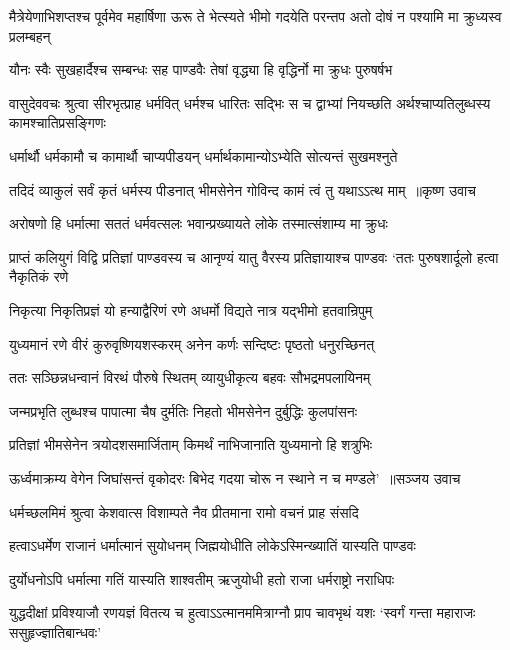 \threelineshloka
{मैत्रेयेणाभिशप्तश्च पूर्वमेव महार्षिणा}
{ऊरू ते भेत्स्यते भीमो गदयेति परन्तप}
{अतो दोषं न पश्यामि मा क्रुध्यस्व प्रलम्बहन्}


\twolineshloka
{यौनः स्वैः सुखहार्दैश्च सम्बन्धः सह पाण्डवैः}
{तेषां वृद्ध्या हि वृद्धिर्नो मा क्रुधः पुरुषर्षभ}


वासुदेववचः श्रुत्वा सीरभृत्प्राह धर्मवित्
\twolineshloka
{धर्मश्च धारितः सद्भिः स च द्वाभ्यां नियच्छति}
{अर्थश्चाप्यतिलुब्धस्य कामश्चातिप्रसङ्गिणः}


\twolineshloka
{धर्मार्थौ धर्मकामौ च कामार्थौ चाप्यपीडयन्}
{धर्मार्थकामान्योऽभ्येति सोत्यन्तं सुखमश्नुते}


\threelineshloka
{तदिदं व्याकुलं सर्वं कृतं धर्मस्य पीडनात्}
{भीमसेनेन गोविन्द कामं त्वं तु यथाऽऽत्थ माम् ॥कृष्ण उवाच}
{}


\twolineshloka
{अरोषणो हि धर्मात्मा सततं धर्मवत्सलः}
{भवान्प्रख्यायते लोके तस्मात्संशाम्य मा क्रुधः}


\threelineshloka
{प्राप्तं कलियुगं विद्वि प्रतिज्ञां पाण्डवस्य च}
{आनृण्यं यातु वैरस्य प्रतिज्ञायाश्च पाण्डवः}
{`ततः पुरुषशार्दूलो हत्वा नैकृतिकं रणे}


\twolineshloka
{निकृत्या निकृतिप्रज्ञं यो हन्याद्वैरिणं रणे}
{अधर्मो विद्यते नात्र यद्भीमो हतवान्रिपुम्}


\twolineshloka
{युध्यमानं रणे वीरं कुरुवृष्णियशस्करम्}
{अनेन कर्णः सन्दिष्टः पृष्ठतो धनुरच्छिनत्}


\twolineshloka
{ततः सञ्छिन्नधन्वानं विरथं पौरुषे स्थितम्}
{व्यायुधीकृत्य बहवः सौभद्रमपलायिनम्}


\twolineshloka
{जन्मप्रभृति लुब्धश्च पापात्मा चैष दुर्मतिः}
{निहतो भीमसेनेन दुर्बुद्धिः कुलपांसनः}


\twolineshloka
{प्रतिज्ञां भीमसेनेन त्रयोदशसमार्जिताम्}
{किमर्थं नाभिजानाति युध्यमानो हि शत्रुभिः}


\threelineshloka
{ऊर्ध्वमाक्रम्य वेगेन जिघांसन्तं वृकोदरः}
{बिभेद गदया चोरू न स्थाने न च मण्डले' ॥सञ्जय उवाच}
{}


\twolineshloka
{धर्मच्छलमिमं श्रुत्वा केशवात्स विशाम्पते}
{नैव प्रीतमाना रामो वचनं प्राह संसदि}


\twolineshloka
{हत्वाऽधर्मेण राजानं धर्मात्मानं सुयोधनम्}
{जिह्मयोधीति लोकेऽस्मिन्ख्यातिं यास्यति पाण्डवः}


\twolineshloka
{दुर्योधनोऽपि धर्मात्मा गतिं यास्यति शाश्वतीम्}
{ऋजुयोधी हतो राजा धर्मराष्ट्रो नराधिपः}


\threelineshloka
{युद्धदीक्षां प्रविश्याजौ रणयज्ञं वितत्य च}
{हुत्वाऽऽत्मानममित्राग्नौ प्राप चावभृथं यशः}
{`स्वर्गं गन्ता महाराजः ससुहृज्ज्ञातिबान्धवः'}



